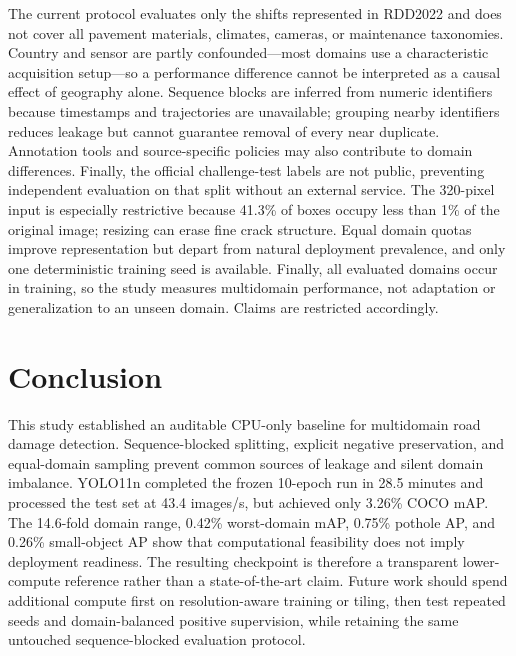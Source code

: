 \documentclass[conference]{ieee-template/vendor/IEEEtran/IEEEtran}
\begin{document}
The current protocol evaluates only the shifts represented in RDD2022 and does
not cover all pavement materials, climates, cameras, or maintenance taxonomies.
Country and sensor are partly confounded---most domains use a characteristic
acquisition setup---so a performance difference cannot be interpreted as a
causal effect of geography alone. Sequence blocks are inferred from numeric
identifiers because timestamps and trajectories are unavailable; grouping
nearby identifiers reduces leakage but cannot guarantee removal of every near
duplicate. Annotation tools and source-specific policies may also contribute
to domain differences. Finally, the official challenge-test labels are not
public, preventing independent evaluation on that split without an external
service. The 320-pixel input is especially restrictive because 41.3\% of boxes
occupy less than 1\% of the original image; resizing can erase fine crack
structure. Equal domain quotas improve representation but depart from natural
deployment prevalence, and only one deterministic training seed is available.
Finally, all evaluated domains occur in training, so the study measures
multidomain performance, not adaptation or generalization to an unseen domain.
Claims are restricted accordingly.

\section{Conclusion}
This study established an auditable CPU-only baseline for multidomain road
damage detection. Sequence-blocked splitting, explicit negative preservation,
and equal-domain sampling prevent common sources of leakage and silent domain
imbalance. YOLO11n completed the frozen 10-epoch run in 28.5 minutes and
processed the test set at 43.4 images/s, but achieved only 3.26\% COCO mAP.
The 14.6-fold domain range, 0.42\% worst-domain mAP, 0.75\% pothole AP, and
0.26\% small-object AP show that computational feasibility does not imply
deployment readiness. The resulting checkpoint is therefore a transparent
lower-compute reference rather than a state-of-the-art claim. Future work
should spend additional compute first on resolution-aware training or tiling,
then test repeated seeds and domain-balanced positive supervision, while
retaining the same untouched sequence-blocked evaluation protocol.



\end{document}
